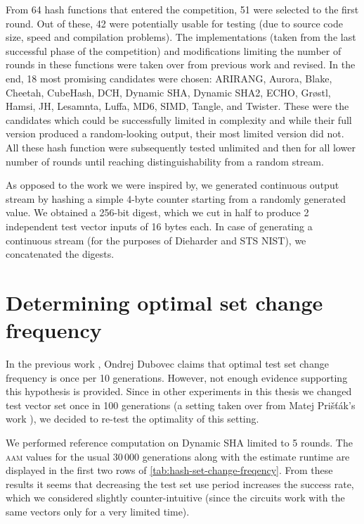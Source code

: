 \documentclass[12pt,oneside]{fithesis2}
\begin{document}
From 64 hash functions that entered the competition, 51 were selected to the first round. 
Out of these, 42 were potentially usable for testing (due to source code size, speed and compilation problems).
The implementations (taken from the last successful phase of the competition) and
modifications limiting the number of rounds in these functions were taken over from previous work \parencite{thesis-dubovec}
and revised. In the end, 18 most promising candidates were chosen: ARIRANG, Aurora, Blake, Cheetah, CubeHash, DCH, 
Dynamic SHA, Dynamic SHA2, ECHO, Grøstl, Hamsi, JH, Lesamnta, Luffa, MD6, SIMD, Tangle, and Twister.
These were the candidates which could be successfully limited in complexity and while their full version produced a random-looking
output, their most limited version did not. All these hash function were subsequently tested unlimited and
then for all lower number of rounds until reaching distinguishability from a random stream.

As opposed to the work we were inspired by, we generated continuous output stream by hashing a simple 4-byte counter starting
from a randomly generated value. We obtained a 256-bit digest, which we cut in half to produce 2 independent test vector inputs
of 16 bytes each. In case of generating a continuous stream (for the purposes of Dieharder and STS NIST), we concatenated 
the digests.

\section{Determining optimal set change frequency}
\label{sec:hash-set-change-freqency}

In the previous work \parencite{thesis-dubovec}, Ondrej Dubovec claims that optimal test set change frequency is once
per 10 generations. However, not enough evidence supporting this hypothesis is provided. Since in other experiments in this thesis
we changed test vector set once in 100 generations (a setting taken over from Matej Prišťák's work \parencite{thesis-pristak}), 
we decided to re-test the optimality of this setting.

We performed reference computation on Dynamic SHA limited to 5 rounds. The \textsc{aam} values for the usual 30\,000 generations
along with the estimate runtime are displayed in the first two rows of \autoref{tab:hash-set-change-freqency}.
From these results it seems that decreasing the test set use period increases the success rate, which we considered slightly
counter-intuitive (since the circuits work with the same vectors only for a very limited time).
\end{document}
